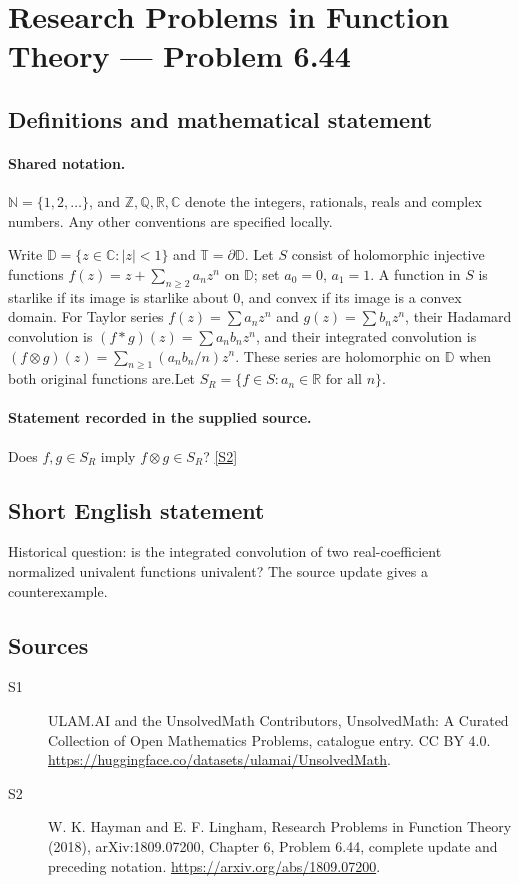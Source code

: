 \documentclass[11pt]{article}
\newcommand{\sref}[2]{\hyperlink{source:#1:#2}{[S#2]}}
\begin{document}
\section{Research Problems in Function Theory — Problem 6.44}\label{statement}

\subsection{Definitions and mathematical statement}

\paragraph{Shared notation.}$\mathbb N=\{1,2,\ldots\}$, and $\mathbb Z,\mathbb Q,\mathbb R,\mathbb C$ denote the integers, rationals, reals and complex numbers. Any other conventions are specified locally.


Write $\mathbb D=\{z\in\mathbb C:|z|<1\}$ and $\mathbb T=\partial\mathbb D$. Let $S$ consist of holomorphic injective functions $f(z)=z+\sum_{n\ge2}a_nz^n$ on $\mathbb D$; set $a_0=0$, $a_1=1$. A function in $S$ is starlike if its image is starlike about $0$, and convex if its image is a convex domain. For Taylor series $f(z)=\sum a_nz^n$ and $g(z)=\sum b_nz^n$, their Hadamard convolution is $(f*g)(z)=\sum a_nb_nz^n$, and their integrated convolution is $(f\otimes g)(z)=\sum_{n\ge1}(a_nb_n/n)z^n$. These series are holomorphic on $\mathbb D$ when both original functions are.Let $S_R=\{f\in S:a_n\in\mathbb R\text{ for all }n\}$.
\paragraph{Statement recorded in the supplied source.}
Does $f,g\in S_R$ imply $f\otimes g\in S_R$? \sref{statement}{2}
\subsection{Short English statement}
Historical question: is the integrated convolution of two real-coefficient normalized univalent functions univalent? The source update gives a counterexample.
\subsection{Sources}
\begin{description}
\item[\hypertarget{source:statement:1}{S1}] ULAM.AI and the UnsolvedMath Contributors, UnsolvedMath: A Curated Collection of Open Mathematics Problems, catalogue entry. CC BY 4.0. \url{https://huggingface.co/datasets/ulamai/UnsolvedMath}.
\item[\hypertarget{source:statement:2}{S2}] W. K. Hayman and E. F. Lingham, Research Problems in Function Theory (2018), arXiv:1809.07200, Chapter 6, Problem 6.44, complete update and preceding notation. \url{https://arxiv.org/abs/1809.07200}.
\end{description}
\label{end:statement}
\end{document}

